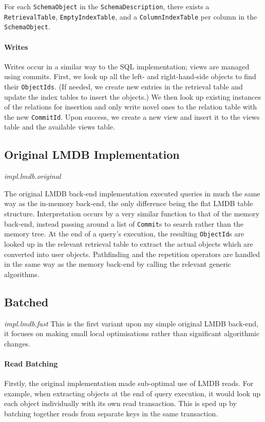 \documentclass[12pt,a4paper,twoside,openright]{report}
\newcommand\codeName[1]{\texttt{#1}}
\newcommand\note[1]{\textit{#1}}
\begin{document}
For each \codeName{SchemaObject} in the \codeName{SchemaDescription}, there exists a \codeName{RetrievalTable}, \codeName{EmptyIndexTable}, and a \codeName{ColumnIndexTable} per column in the \codeName{SchemaObject}.
		
		
		\paragraph{Writes}
		Writes occur in a similar way to the SQL implementation; views are managed using commits. First, we look up all the left- and right-hand-side objects to find their \codeName{ObjectIds}. (If needed, we create new entries in the retrieval table and update the index tables to insert the objects.) We then look up existing instances of the relations for insertion and only write novel ones to the relation table with the new \codeName{CommitId}. Upon success, we create a new view and insert it to the views table and the available views table.

	\subsection{Original LMDB Implementation}
	\note{impl.lmdb.original}

The original LMDB back-end implementation executed queries in much the same way as the in-memory back-end, the only difference being the flat LMDB table structure. Interpretation occurs by a very similar function to that of the memory back-end, instead passing around a list of \codeName{Commit}s to search rather than the memory tree. At the end of a query's execution, the resulting \codeName{ObjectId}s are looked up in the relevant retrieval table to extract the actual objects which are converted into user objects. Pathfinding and the repetition operators are handled in the same way as the memory back-end by calling the relevant generic algorithms.
 

	\subsection{Batched}
	\note{impl.lmdb.fast}
	This is the first variant upon my simple original LMDB back-end, it focuses on making small local optimisations rather than significant algorithmic changes.
	
		\paragraph{Read Batching}
		Firstly, the original implementation made sub-optimal use of LMDB reads. For example, when extracting objects at the end of query execution, it would look up each object individually with its own read transaction. This is sped up by batching together reads from separate keys in the same transaction.
		
\end{document}
